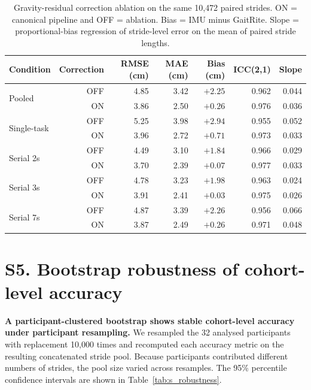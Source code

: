 \documentclass[fleqn,10pt,lineno]{wlpeerj}
\begin{document}
\begin{table}[!ht]
\centering
\caption{Gravity-residual correction ablation on the same 10{,}472 paired strides. ON = canonical pipeline and OFF = ablation. Bias = IMU minus GaitRite. Slope = proportional-bias regression of stride-level error on the mean of paired stride lengths.}
\label{tab:s_ablation_smoothing}
\small
\begin{tabular}{@{}lrrrrrr@{}}
\toprule
Condition & Correction & RMSE (cm) & MAE (cm) & Bias (cm) & ICC(2,1) & Slope \\
\midrule
\multirow{2}{*}{Pooled}      & OFF & 4.85 & 3.42 & $+2.25$ & 0.962 & 0.044 \\
                             & ON  & 3.86 & 2.50 & $+0.26$ & 0.976 & 0.036 \\
\midrule
\multirow{2}{*}{Single-task} & OFF & 5.25 & 3.98 & $+2.94$ & 0.955 & 0.052 \\
                             & ON  & 3.96 & 2.72 & $+0.71$ & 0.973 & 0.033 \\
\multirow{2}{*}{Serial 2s}   & OFF & 4.49 & 3.10 & $+1.84$ & 0.966 & 0.029 \\
                             & ON  & 3.70 & 2.39 & $+0.07$ & 0.977 & 0.033 \\
\multirow{2}{*}{Serial 3s}   & OFF & 4.78 & 3.23 & $+1.98$ & 0.963 & 0.024 \\
                             & ON  & 3.91 & 2.41 & $+0.03$ & 0.975 & 0.026 \\
\multirow{2}{*}{Serial 7s}   & OFF & 4.87 & 3.39 & $+2.26$ & 0.956 & 0.066 \\
                             & ON  & 3.87 & 2.49 & $+0.26$ & 0.971 & 0.048 \\
\bottomrule
\end{tabular}
\end{table}


\section*{S5. Bootstrap robustness of cohort-level accuracy}

\textbf{A participant-clustered bootstrap shows stable cohort-level accuracy under participant resampling.} We resampled the 32 analysed participants with replacement 10{,}000 times and recomputed each accuracy metric on the resulting concatenated stride pool. Because participants contributed different numbers of strides, the pool size varied across resamples. The 95\% percentile confidence intervals are shown in Table~\ref{tab:s_robustness}.
\end{document}
